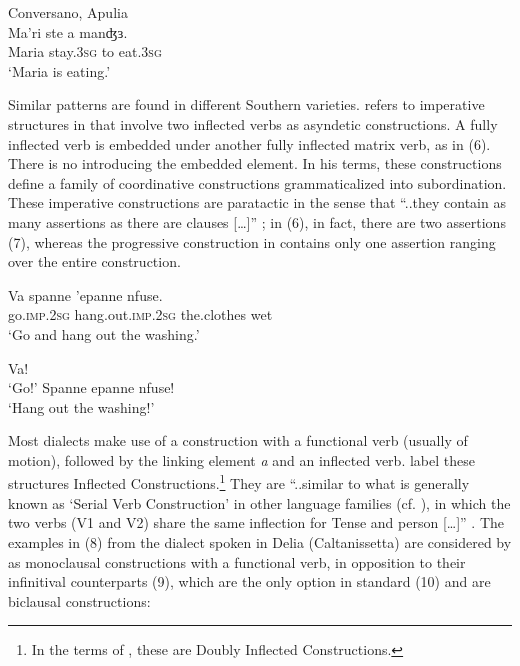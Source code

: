\documentclass[output=paper]{langsci/langscibook}
\begin{document}
\ea%
         Conversano, Apulia\label{ex:lorusso:5}\\
    \gll Ma'ri  ste     a   manʤɜ.\\
         Maria  stay.\textsc{3sg}  to  eat.\textsc{3sg}\\
    \glt ‘Maria is eating.’
    \z          

Similar patterns are found in different Southern  varieties. \citet{Ledgeway1997} refers to imperative structures in  that involve two inflected verbs as asyndetic constructions. A fully inflected verb is embedded under another fully inflected matrix verb, as in (6). There is no  introducing the embedded element. In his terms, these constructions define a family of coordinative constructions grammaticalized into subordination. These imperative constructions are paratactic in the sense that “..they contain as many assertions as there are clauses […]” \citep[231]{Ledgeway1997}; in (6), in fact, there are two assertions (7), whereas the progressive construction in  contains only one assertion ranging over the entire construction.

\ea%
    \label{ex:lorusso:6}
    \gll Va     spanne     'epanne  nfuse.\\
         go.\textsc{imp.2sg} hang.out.\textsc{imp.2sg}  the.clothes  wet\\
    \glt ‘Go and hang out the washing.’ \citep[230]{Ledgeway1997}
    \z

\ea%
    \label{ex:lorusso:7}
    \ea   Va!\\
    \glt  ‘Go!’
    \ex   Spanne epanne nfuse!\\
    \glt  ‘Hang out the washing!’ \citep[231]{Ledgeway1997}
    \z
\z

Most  dialects make use of a construction with a functional verb (usually of motion), followed by the linking element \textit{a} and an inflected verb. \citet{Cardinaletti2001,Cardinaletti2003} label these structures Inflected Constructions.\footnote{In the terms of \citet{Cruschina2013}, these are Doubly Inflected Constructions.} They are “..similar to what is generally known as ‘Serial Verb Construction’ in other language families (cf. \citealt{Aikhenvald2006}), in which the two verbs (V1 and V2) share the same inflection for Tense and person […]” \citep[392]{Di2015}. The examples in (8) from the dialect spoken in Delia (Caltanissetta) are considered by \citet{Di2015} as monoclausal constructions with a functional verb, in opposition to their infinitival counterparts (9), which are the only option in standard  (10) and are biclausal constructions:
\end{document}
